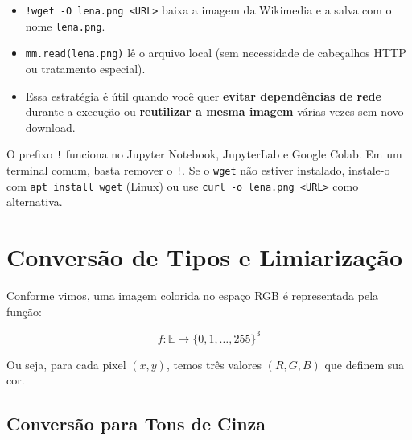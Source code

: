 \documentclass[
  portuguese,
  letterpaper,
  openany,
  oneside,
  12pt,
  a4paper]{book}
\providecommand{\tightlist}{%
  \setlength{\itemsep}{0pt}\setlength{\parskip}{0pt}}
\begin{document}
\begin{itemize}
\tightlist
\item
  \texttt{!wget\ -O\ lena.png\ \textless{}URL\textgreater{}} baixa a
  imagem da Wikimedia e a salva com o nome \texttt{lena.png}.
\item
  \texttt{mm.read(\textquotesingle{}lena.png\textquotesingle{})} lê o
  arquivo local (sem necessidade de cabeçalhos HTTP ou tratamento
  especial).
\item
  Essa estratégia é útil quando você quer \textbf{evitar dependências de
  rede} durante a execução ou \textbf{reutilizar a mesma imagem} várias
  vezes sem novo download.
\end{itemize}

\begin{tcolorbox}[enhanced jigsaw, colframe=quarto-callout-tip-color-frame, opacitybacktitle=0.6, coltitle=black, rightrule=.15mm, bottomrule=.15mm, arc=.35mm, toprule=.15mm, breakable, opacityback=0, colbacktitle=quarto-callout-tip-color!10!white, left=2mm, title=\textcolor{quarto-callout-tip-color}{\faLightbulb}\hspace{0.5em}{Nota}, bottomtitle=1mm, toptitle=1mm, titlerule=0mm, leftrule=.75mm, colback=white]

O prefixo \texttt{!} funciona no Jupyter Notebook, JupyterLab e Google
Colab. Em um terminal comum, basta remover o \texttt{!}. Se o
\texttt{wget} não estiver instalado, instale-o com
\texttt{apt\ install\ wget} (Linux) ou use
\texttt{curl\ -o\ lena.png\ \textless{}URL\textgreater{}} como
alternativa.

\end{tcolorbox}

\section{Conversão de Tipos e
Limiarização}\label{conversuxe3o-de-tipos-e-limiarizauxe7uxe3o}

Conforme vimos, uma imagem colorida no espaço RGB é representada pela
função:

\[
f: \mathbb{E} \to \{0,1,\dots,255\}^3
\]

Ou seja, para cada pixel \((x,y)\), temos três valores \((R,G,B)\) que
definem sua cor.

\subsection*{Conversão para Tons de
Cinza}\label{conversuxe3o-para-tons-de-cinza}
\end{document}
